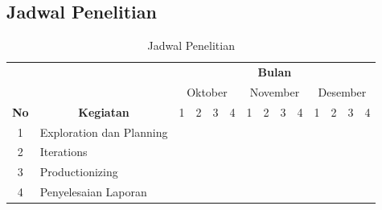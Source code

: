 \begin{spacing}{2}
\section{Jadwal Penelitian}
	\begin{table}[H]
  \centering
  \caption{Jadwal Penelitian}
  \label{my-label}
  \begin{tabular}{|c|l|l|l|l|l|l|l|l|l|l|l|l|l|}
  \hline
                                & \multicolumn{1}{c|}{}                                    & \multicolumn{12}{c|}{\textbf{Bulan}}                                                                                                                                     \\ \cline{3-14} 
                                & \multicolumn{1}{c|}{}                                    & \multicolumn{4}{c|}{Oktober}                                          & \multicolumn{4}{c|}{November}                    & \multicolumn{4}{c|}{Desember}                 \\ \cline{3-14} 
  \multirow{-3}{*}{\textbf{No}} & \multicolumn{1}{c|}{\multirow{-3}{*}{\textbf{Kegiatan}}} & 1                     & 2                     & 3          & 4        & 1     & 2     & 3     & 4                        & 1         & 2         & 3         & 4         \\ \hline
  1                             & Exploration dan Planning                                 & \multicolumn{2}{l|}{\cellcolor[HTML]{656565}} &            &          &       &       &       &                          &           &           &           &           \\ \hline
  2                             & Iterations                                               &                       &                       & \multicolumn{5}{l|}{\cellcolor[HTML]{656565}} &                          &           &           &           &           \\ \hline
  3                             & Productionizing                                          &                       &                       &            &          &       &       &       & \cellcolor[HTML]{656565} &           &           &           &           \\ \hline
  4                             & Penyelesaian Laporan                                     &                       &                       &            &          &       &       &       &                          & \multicolumn{4}{l|}{\cellcolor[HTML]{656565}} \\ \hline
  \end{tabular}
  \end{table}

\end{spacing}

